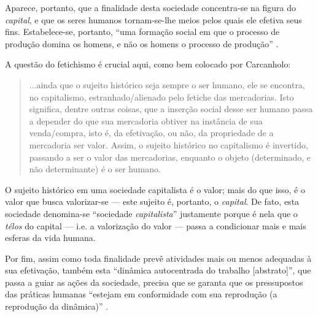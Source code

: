 \documentclass[12pt]{article}
\numberwithin{equation}{section}
\theoremstyle{plain}
\theoremstyle{definition}
\theoremstyle{remark}
\begin{document}
Aparece, portanto, que a finalidade desta sociedade concentra-se na figura do \textit{capital}, e que os seres humanos tornam-se-lhe meios pelos quais ele efetiva seus fins. Estabelece-se, portanto, ``uma formação social em que o processo de produção domina os homens, e não os homens o processo de produção'' \parencite[p. 156]{Marx2017}.

A questão do fetichismo é crucial aqui, como bem colocado por Carcanholo:
\begin{quote}
    ...ainda que o sujeito histórico seja sempre o ser humano, ele se encontra, no capitalismo, estranhado/alienado pelo fetiche das mercadorias. Isto significa, dentre outras coisas, que a inserção social desse ser humano passa a depender do que sua mercadoria obtiver na instância de sua venda/compra, isto é, da efetivação, ou não, da propriedade de a mercadoria ser valor. Assim, o sujeito histórico no capitalismo é invertido, passando a ser o valor das mercadorias, enquanto o objeto (determinado, e não determinante) é o ser humano. \parencite[p. 119]{Carcanholo2021}
\end{quote}

O sujeito histórico em uma sociedade capitalista é o valor; mais do que isso, é o valor que busca valorizar-se --- este sujeito é, portanto, o \textit{capital}. De fato, esta sociedade denomina-se ``sociedade \textit{capitalista}'' justamente porque é nela que o \textit{télos} do capital --- i.e. a valorização do valor --- passa a condicionar mais e mais esferas da vida humana. 

Por fim, assim como toda finalidade prevê atividades mais ou menos adequadas à sua efetivação, também esta ``dinâmica autocentrada do trabalho [abstrato]'', que passa a guiar as ações da sociedade, precisa que se garanta que os pressupostos das práticas humanas ``estejam em conformidade com sua reprodução (a reprodução da dinâmica)'' \parencite[p. 329]{Medeiros2013a}.






\end{document}
